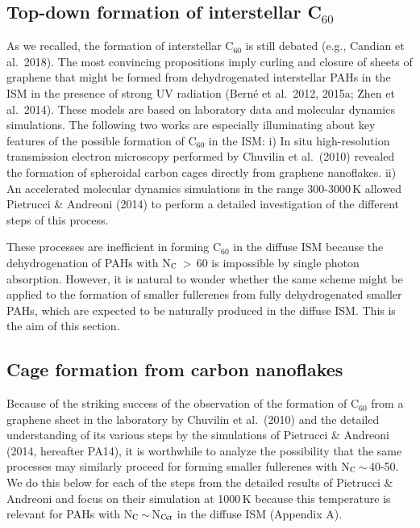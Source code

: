 \documentclass{aa}
\begin{document}
\subsection{Top-down formation of interstellar C$_{60}$}

As we recalled, the formation of interstellar  C$_{60}$ is still debated (e.g., Candian et al.\ 2018). The most convincing propositions imply curling 
and closure of sheets of graphene that might be formed  from dehydrogenated interstellar PAHs in the ISM in the presence of strong UV radiation (Bern\'e et al.\ 2012, 2015a; Zhen et al.\  2014). These models are based on laboratory data and molecular dynamics simulations. The following two works are especially illuminating about key features of the possible formation of C$_{60}$ in the ISM: i) In situ high-resolution transmission electron microscopy performed by Chuvilin et al.\ (2010) revealed the formation of spheroidal carbon cages directly from graphene nanoflakes. ii) An accelerated molecular dynamics simulations in the range 300-3000\,K allowed Pietrucci \& Andreoni (2014) to perform a detailed investigation of the different steps of this process. 

These processes are inefficient in forming C$_{60}$ in the diffuse ISM because the  dehydrogenation of PAHs with N$_{\rm C}$\,$>$\,60 is impossible 
by single photon absorption. 
However, it is natural to wonder whether the same scheme might be applied 
to the formation of smaller fullerenes from fully dehydrogenated smaller PAHs, which are expected to be naturally produced in the diffuse ISM. This is the aim of this section.


\subsection{Cage formation from carbon nanoflakes}

Because of the striking success of the observation of the formation of C$_{60}$ from a graphene sheet in the laboratory by Chuvilin et al.\ (2010) 
and the detailed understanding of its various steps by the simulations of 
Pietrucci \& Andreoni (2014, hereafter PA14), it is worthwhile to analyze 
the possibility that the same processes may similarly proceed for forming smaller fullerenes with N$_{\rm C}$\,$\sim$\,40-50. We do this below for each 
of the steps from the detailed results of Pietrucci \& Andreoni and focus on their simulation  at 1000\,K because this temperature is relevant for PAHs with N$_{\rm C}$\,$\sim$\,N$_{\rm Ccr}$ in the diffuse ISM (Appendix A). 
\end{document}
